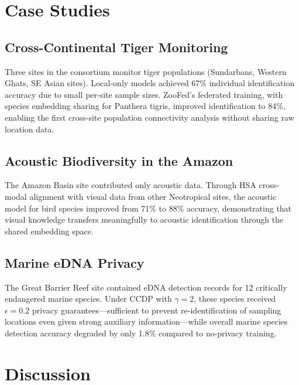 \documentclass[11pt,a4paper]{article}
\begin{document}
\section{Case Studies}
\label{sec:case_studies}

\subsection{Cross-Continental Tiger Monitoring}

Three sites in the consortium monitor tiger populations (Sundarbans, Western Ghats, SE Asian sites).
Local-only models achieved 67\% individual identification accuracy due to small per-site sample sizes.
ZooFed's federated training, with species embedding sharing for Panthera tigris, improved identification to 84\%, enabling the first cross-site population connectivity analysis without sharing raw location data.

\subsection{Acoustic Biodiversity in the Amazon}

The Amazon Basin site contributed only acoustic data.
Through HSA cross-modal alignment with visual data from other Neotropical sites, the acoustic model for bird species improved from 71\% to 88\% accuracy, demonstrating that visual knowledge transfers meaningfully to acoustic identification through the shared embedding space.

\subsection{Marine eDNA Privacy}

The Great Barrier Reef site contained eDNA detection records for 12 critically endangered marine species.
Under CCDP with $\gamma=2$, these species received $\epsilon=0.2$ privacy guarantees---sufficient to prevent re-identification of sampling locations even given strong auxiliary information---while overall marine species detection accuracy degraded by only 1.8\% compared to no-privacy training.

\section{Discussion}
\label{sec:discussion}
\end{document}
